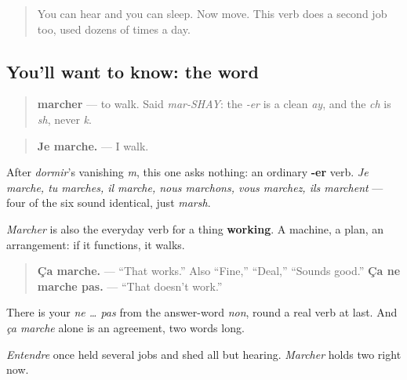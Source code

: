 \begin{quote}
You can hear and you can sleep. Now move. This verb does a second job too, used dozens of times a day.
\end{quote}

\subsection*{You'll want to know: the word}
\begin{quote}
\textbf{marcher} — to walk. Said \emph{mar-SHAY}: the \emph{-er} is a clean \emph{ay}, and the \emph{ch} is \emph{sh}, never \emph{k}.
\end{quote}

\begin{quote}
\textbf{Je marche.} — I walk.
\end{quote}

After \emph{dormir}'s vanishing \emph{m}, this one asks nothing: an ordinary \textbf{-er} verb. \emph{Je marche, tu marches, il marche, nous marchons, vous marchez, ils marchent} — four of the six sound identical, just \emph{marsh}.

\begin{culture}
\emph{Marcher} is also the everyday verb for a thing \textbf{working}. A machine, a plan, an arrangement: if it functions, it walks.

\begin{quote}
\textbf{Ça marche.} — \textquotedblleft{}That works.\textquotedblright{} Also \textquotedblleft{}Fine,\textquotedblright{} \textquotedblleft{}Deal,\textquotedblright{} \textquotedblleft{}Sounds good.\textquotedblright{} \textbf{Ça ne marche pas.} — \textquotedblleft{}That doesn't work.\textquotedblright{}
\end{quote}

There is your \emph{ne … pas} from the answer-word \emph{non}, round a real verb at last. And \emph{ça marche} alone is an agreement, two words long.

\emph{Entendre} once held several jobs and shed all but hearing. \emph{Marcher} holds two right now.
\end{culture}

